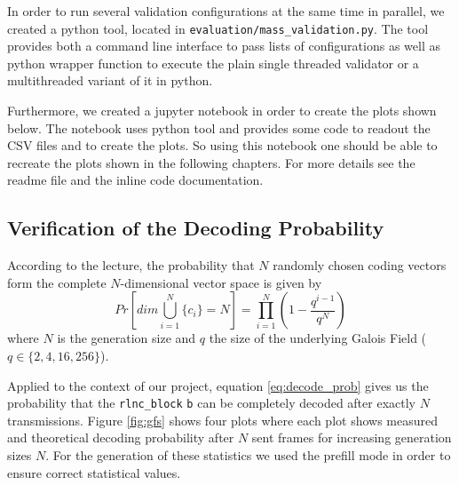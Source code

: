 \documentclass[a4paper,english,10pt]{tumarticle}
\begin{document}
In order to run several validation configurations at the same time in parallel, we created a python
tool, located in \texttt{evaluation/mass\_validation.py}. The tool provides both a command line
interface to pass lists of configurations as well as python wrapper function to execute the plain
single threaded validator or a multithreaded variant of it in python.

Furthermore, we created a jupyter notebook in order to create the plots shown below. The notebook
uses python tool and provides some code to readout the CSV files and to create the plots. So using
this notebook one should be able to recreate the plots shown in the following chapters. For more
details see the readme file and the inline code documentation.




\subsection{Verification of the Decoding Probability}
According to the lecture, the probability that $N$ randomly chosen coding vectors form
the complete $N$-dimensional vector space is given by
\begin{equation} 
  Pr[dim\bigcup_{i=1}^{N}\{c_i\} = N] = \prod_{i=1}^{N} (1 - \frac{q^{i - 1}}{q ^ {N}})
  \label{eq:decode_prob}
\end{equation}
where $N$ is the generation size and $q$ the size of the underlying Galois Field ($q \in
\{2,4,16,256\}$).

Applied to the context of our project, equation \eqref{eq:decode_prob} gives us
the probability that the \texttt{rlnc\_block} \texttt{b} can be completely
decoded after exactly $N$ transmissions. Figure \ref{fig:gfs} shows four plots
where each plot shows measured and theoretical decoding probability after $N$
sent frames for increasing generation sizes $N$. For the generation of these
statistics we used the prefill mode in order to ensure correct statistical values.
\end{document}
